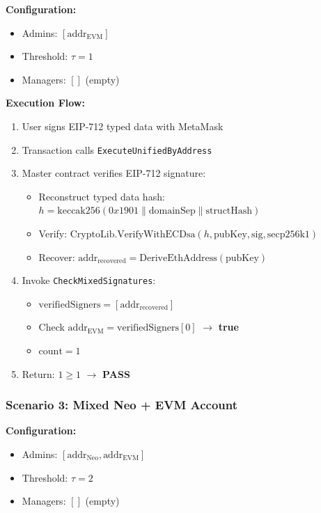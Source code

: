 \documentclass[10pt,twocolumn]{article}
\newcommand{\code}[1]{\texttt{\small #1}}
\begin{document}
{\textbf{Configuration:}
\begin{itemize}[leftmargin=*,topsep=2pt,itemsep=1pt]
\item Admins: $[\text{addr}_{\text{EVM}}]$
\item Threshold: $\tau = 1$
\item Managers: $[]$ (empty)
\end{itemize}

\textbf{Execution Flow:}
\begin{enumerate}[leftmargin=*,topsep=2pt,itemsep=1pt]
\item User signs EIP-712 typed data with MetaMask
\item Transaction calls \code{ExecuteUnifiedByAddress}
\item Master contract verifies EIP-712 signature:
  \begin{itemize}[leftmargin=*,topsep=1pt,itemsep=0pt]
  \item Reconstruct typed data hash: $h = \text{keccak256}(0x1901 \| \text{domainSep} \| \text{structHash})$
  \item Verify: $\text{CryptoLib.VerifyWithECDsa}(h, \text{pubKey}, \text{sig}, \text{secp256k1})$
  \item Recover: $\text{addr}_{\text{recovered}} = \text{DeriveEthAddress}(\text{pubKey})$
  \end{itemize}
\item Invoke \code{CheckMixedSignatures}:
  \begin{itemize}[leftmargin=*,topsep=1pt,itemsep=0pt]
  \item $\text{verifiedSigners} = [\text{addr}_{\text{recovered}}]$
  \item Check $\text{addr}_{\text{EVM}} = \text{verifiedSigners}[0]$ $\rightarrow$ \textbf{true}
  \item $\text{count} = 1$
  \end{itemize}
\item Return: $1 \geq 1$ $\rightarrow$ \textbf{PASS}
\end{enumerate}


\subsubsection{Scenario 3: Mixed Neo + EVM Account}

\textbf{Configuration:}
\begin{itemize}[leftmargin=*,topsep=2pt,itemsep=1pt]
\item Admins: $[\text{addr}_{\text{Neo}}, \text{addr}_{\text{EVM}}]$
\item Threshold: $\tau = 2$
\item Managers: $[]$ (empty)
\end{itemize}

}
\end{document}
